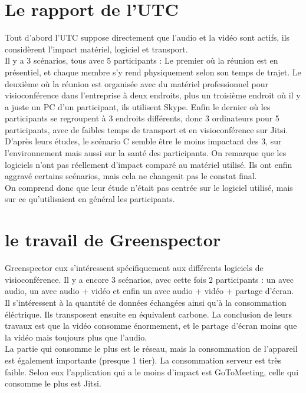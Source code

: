 \documentclass[11pt,a4paper]{report}
\begin{document}
\section{Le rapport de l'UTC}
Tout d'abord l'UTC suppose directement que l'audio et la vidéo sont actifs, ils considèrent l'impact matériel, logiciel et transport.\\
Il y a 3 scénarios, tous avec 5 participants : Le premier où la réunion est en présentiel, et chaque membre s'y rend physiquement selon son temps de trajet. Le deuxième où la réunion est organisée avec du matériel professionnel pour visioconférence dans l'entreprise à deux endroits, plus un troisième endroit où il y a juste un PC d'un participant, ils utilisent Skype. Enfin le dernier où les participants se regroupent à 3 endroits différents, donc 3 ordinateurs pour 5 participants, avec de faibles temps de transport et en visioconférence sur Jitsi.\\
D'après leurs études, le scénario C semble être le moins impactant des 3, sur l'environnement mais aussi sur la santé des participants. On remarque que les logiciels n'ont pas réellement d'impact comparé au matériel utilisé. Ils ont enfin aggravé certains scénarios, mais cela ne changeait pas le constat final.\\
On comprend donc que leur étude n'était pas centrée sur le logiciel utilisé, mais sur ce qu'utilisaient en général les participants.

\section{le travail de Greenspector}
Greenspector eux s'intéressent spécifiquement aux différents logiciels de visioconférence. Il y a encore 3 scénarios, avec cette fois 2 participants : un avec audio, un avec audio + vidéo et enfin un avec audio + vidéo + partage d'écran.\\
Il s'intéressent à la quantité de données échangées ainsi qu'à la consommation éléctrique. Ils transposent ensuite en équivalent carbone. La conclusion de leurs travaux est que la vidéo consomme énormement, et le partage d'écran moins que la vidéo mais toujours plus que l'audio.\\
La partie qui consomme le plus est le réseau, mais la consommation de l'appareil est également importante (presque 1 tier). La consommation serveur est très faible. Selon eux l'application qui a le moins d'impact est GoToMeeting, celle qui consomme le plus est Jitsi.
\end{document}

